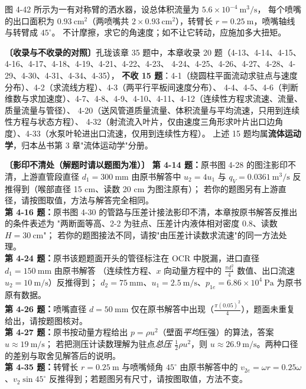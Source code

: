 \begin{ti}
\item[\textbf{4-35}] 图 4-42 所示为一有对称臂的洒水器，设总体积流量为 $5.6\times10^{-4}\ \mathrm{m^3/s}$，
每个喷嘴的出口面积为 $0.93\ \mathrm{cm^2}$（两喷嘴共 $2\times0.93\ \mathrm{cm^2}$），转臂长 $r=0.25\ \mathrm{m}$，喷嘴轴线与转臂成 $45^\circ$。
不计摩擦，求它的角速度；如不让它转动，应施加多大扭矩。
\quad{}\quad{}

\end{ti}

\begin{tishi}
\textbf{〔收录与不收录的对照〕}孔珑该章 35 题中，本章收录 20 题（4-13、4-14、4-15、4-16、4-17、4-18、4-19、4-21、4-22、4-23、
4-24、4-25、4-26、4-27、4-28、4-29、4-30、4-31、4-34、4-35），
\textbf{不收 15 题}：4-1（绕圆柱平面流动求驻点与速度分布）、4-2（求流线方程）、4-3（两平行平板间速度分布）、
4-4、4-5、4-6（判断维数与求加速度）、4-7、4-8、4-9、4-10、4-11、4-12（连续性方程求流速、流量、质量流量与管径）、
4-20（送风管道质量流量、体积流量与平均流速，只用到连续性方程与状态方程）、
4-32（射流流入叶片，仅由速度三角形求叶片出口边角度）、4-33（水泵叶轮进出口流速，仅用到连续性方程）。
上述 15 题均属\textbf{流体运动学}，归本丛书第 3 章"流体运动学"分册。

\textbf{〔影印不清处（解题时请以题图为准）〕}
\textbf{第 4-14 题：}原书图 4-28 的图注影印不清，上游直管段直径 $d_1=300\ \mathrm{mm}$ 由原书解答中
$u_2=4u_1$ 与 $q_V=0.0361\ \mathrm{m^3/s}$ 反推得到（喉部直径 15 cm、读数 20 cm 为图注原有）；
若你的题图另有上游直径，请按图取值，方法与解答完全相同。\\
\textbf{第 4-16 题：}原书图 4-30 的管路与压差计接法影印不清，本章按原书解答反推出的条件表述为
"两断面等高、2-2 为驻点、压差计内液体相对密度 0.8、读数 $H=30\ \mathrm{cm}$"；
若你的题图接法不同，请按"由压差计读数求流速"的同一方法处理。\\
\textbf{第 4-24 题：}原书该题题面开头的管径标注在 OCR 中脱漏，进口直径 $d_1=150\ \mathrm{mm}$ 由原书解答
（连续性方程、$x$ 向动量方程中的 $\frac{\pi d_1^2}{4}$ 数值、出口流速 $u_2=10\ \mathrm{m/s}$）反推得到；
$d_2=75\ \mathrm{mm}$、$u_1=2.5\ \mathrm{m/s}$、$p_{1e}=6.86\times10^4\ \mathrm{Pa}$ 为原书原有数据。\\
\textbf{第 4-26 题：}喷嘴直径 $d=50\ \mathrm{mm}$ 仅在原书解答中出现（$\frac{\pi(0.05)^2}{4}$），题面未重复给出，请按题图核对。\\
\textbf{第 4-27 题：}原书按动量方程给出 $p=\rho u^2$（壁面\emph{平均}压强）的算法，答案 $u\approx19\ \mathrm{m/s}$；
若把测压计读数理解为驻点\emph{总压} $\frac{1}{2}\rho u^2$，则 $u\approx26.9\ \mathrm{m/s}$。两种口径的差别与取舍见解答后的说明。\\
\textbf{第 4-35 题：}转臂长 $r=0.25\ \mathrm{m}$ 与喷嘴倾角 $45^\circ$ 由原书解答中的
$v_{2e}=\omega r=0.25\omega$、$v_2\sin45^\circ$ 反推得到；若题图另有尺寸，请按图取值，方法不变。
\end{tishi}
